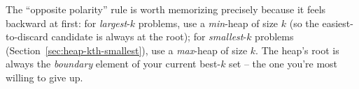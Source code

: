 \begin{takeawaybox}
The ``opposite polarity'' rule is worth memorizing precisely because it
feels backward at first: for \emph{largest}-$k$ problems, use a
\emph{min}-heap of size $k$ (so the easiest-to-discard candidate is always
at the root); for \emph{smallest}-$k$ problems
(Section~\ref{sec:heap-kth-smallest}), use a \emph{max}-heap of size $k$.
The heap's root is always the \emph{boundary} element of your current
best-$k$ set -- the one you're most willing to give up.
\end{takeawaybox}
